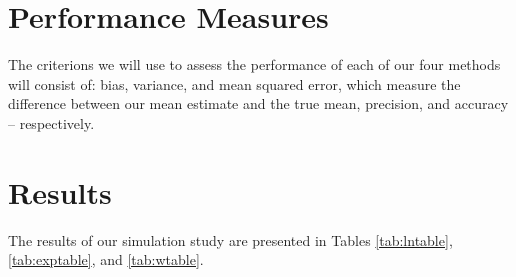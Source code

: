 \documentclass[12pt, twoside]{amherstthesis}
\begin{document}
\hypertarget{performance_measures}{%
\section{Performance Measures}\label{performance_measures}}

The criterions we will use to assess the performance of each of our four methods will consist of: bias, variance, and mean squared error, which measure the difference between our mean estimate and the true mean, precision, and accuracy -- respectively.

\hypertarget{results}{%
\section{Results}\label{results}}

The results of our simulation study are presented in Tables \ref{tab:lntable}, \ref{tab:exptable}, and \ref{tab:wtable}.
\end{document}

